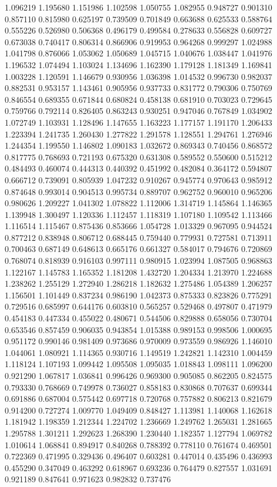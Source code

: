 1.096219
1.195680
1.151986
1.102598
1.050755
1.082955
0.948727
0.901310
0.857110
0.815980
0.625197
0.739509
0.701849
0.663688
0.625533
0.588764
0.555226
0.526980
0.506368
0.496179
0.499584
0.278633
0.556828
0.609727
0.673038
0.740417
0.806314
0.866906
0.919953
0.964268
0.999297
1.024988
1.041798
0.876066
1.053062
1.050689
1.045715
1.040676
1.038447
1.041976
1.196532
1.074494
1.103024
1.134696
1.162390
1.179128
1.181349
1.169841
1.003228
1.120591
1.146679
0.930956
1.036398
1.014532
0.996730
0.982037
0.882531
0.953157
1.143461
0.905956
0.937733
0.831772
0.790306
0.750769
0.846554
0.689355
0.671844
0.680824
0.458138
0.681910
0.703023
0.729645
0.759766
0.792114
0.826405
0.863243
0.930251
0.947046
0.767849
1.034902
1.072749
1.103931
1.128496
1.147655
1.163223
1.177157
1.191170
1.206433
1.223394
1.241735
1.260430
1.277822
1.291578
1.128551
1.294761
1.276946
1.244354
1.199550
1.146802
1.090183
1.032672
0.869343
0.740456
0.868572
0.817775
0.768693
0.721193
0.675320
0.631308
0.589552
0.550600
0.515212
0.484493
0.460074
0.444313
0.440392
0.451992
0.482084
0.364172
0.594807
0.666712
0.739091
0.805939
1.047232
0.910267
0.945774
0.970643
0.985912
0.874648
0.993014
0.904513
0.995734
0.889707
0.962752
0.960010
0.965206
0.980626
1.209227
1.041302
1.078822
1.112006
1.314719
1.145864
1.146365
1.139948
1.300497
1.120336
1.112457
1.118319
1.107180
1.109542
1.113466
1.116514
1.115467
0.875436
0.853666
1.054728
1.013329
0.967095
0.944524
0.877212
0.838948
0.806712
0.688445
0.759440
0.779931
0.727581
0.713911
0.700463
0.687149
0.648613
0.665176
0.661327
0.584017
0.794676
0.720869
0.768074
0.818939
0.916103
0.997111
0.980915
1.023994
1.087505
0.968863
1.122167
1.145783
1.165352
1.181208
1.432720
1.204334
1.213970
1.224688
1.238262
1.255129
1.272940
1.286218
1.182632
1.275486
1.054389
1.206257
1.156501
1.101449
0.837234
0.986190
1.042373
0.875333
0.823826
0.775291
0.729516
0.685997
0.644176
0.603810
0.565257
0.529468
0.497807
0.471979
0.454183
0.447334
0.455022
0.480671
0.544506
0.829888
0.658056
0.730704
0.653546
0.857459
0.906035
0.943854
1.015388
0.989153
0.998506
1.000695
0.951172
0.990146
0.981409
0.973686
0.970009
0.973559
0.986926
1.146010
1.044061
1.080921
1.114365
0.930716
1.149519
1.242821
1.142310
1.004459
1.118124
1.107193
1.099442
1.095508
1.095035
1.018843
1.098111
1.096200
0.921290
1.067817
1.036841
0.996426
0.969300
0.905085
0.862205
0.824575
0.793330
0.768669
0.749978
0.736027
0.858183
0.830868
0.707637
0.699344
0.691886
0.687004
0.575442
0.697718
0.720768
0.757882
0.806213
0.821679
0.914200
0.727274
1.009770
1.049409
0.848427
1.113981
1.140068
1.162618
1.181942
1.198359
1.212344
1.224702
1.236669
1.249762
1.265031
1.281665
1.295788
1.301211
1.292623
1.268390
1.230440
1.182357
1.127794
1.069782
1.010614
1.068841
0.894917
0.840268
0.788392
0.778110
0.761674
0.469501
0.722369
0.471995
0.329436
0.496407
0.603281
0.447014
0.435496
0.436993
0.455290
0.347049
0.463292
0.618967
0.693236
0.764479
0.827557
1.031691
0.921189
0.847641
0.971623
0.982832
0.737476
